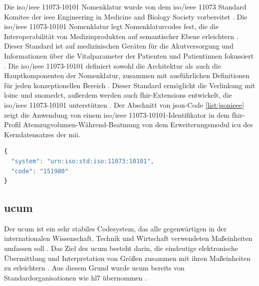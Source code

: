 Die \acs{iso}/\ac{ieee} 11073-10101\texttrademark{} Nomenklatur wurde von dem \acs{iso}/\ac{ieee} 11073\texttrademark{} Standard Komitee der \glqq \ac{ieee} Engineering in Medicine and Biology Society\grqq{} vorbereitet \cite{ieeeiso}. Die \acs{iso}/\ac{ieee} 11073-10101\texttrademark{} Nomenklatur legt Nomenklaturcodes fest, die die Interoperabilität von Medizinprodukten auf semantischer Ebene erleichtern \cite{ieeearch}. Dieser Standard ist auf medizinischen Geräten für die Akutversorgung und Informationen über die Vitalparameter der Patienten und Patientinnen fokussiert \cite{ieeeiso}. Die \acs{iso}/\ac{ieee} 11073-10101\texttrademark{} definiert sowohl die Architektur als auch die Hauptkomponenten der Nomenklatur, zusammen mit ausführlichen Definitionen für jeden konzeptionellen Bereich \cite{ieeesa}. Dieser Standard ermöglicht die Verlinkung mit \ac{loinc} und \ac{snomedct}, außerdem werden auch \ac{fhir}-Extensions entwickelt, die \acs{iso}/\ac{ieee} 11073-10101\texttrademark{} unterstützen \cite{ieeeextending}. Der Abschnitt von \ac{json}-Code \ref{list:jsonieee} zeigt die Anwendung von einem \acs{iso}/\ac{ieee} 11073-10101\texttrademark{}-Identifikator in dem \ac{fhir}-Profil Atemzugvolumen-Während-Beatmung von dem Erweiterungsmodul \glqq\ac{icu}\grqq{} des Kerndatensatzes der \ac{mii}.


\begin{lstlisting}[caption={[\acs{iso}/\acs{ieee} 11073-10101\texttrademark{} in \acs{fhir}] Beispiel der Anwendung von \acs{iso}/\acs{ieee} 11073-10101\texttrademark{} in \acs{fhir}.},language=JavaScript, label=list:jsonieee, captionpos=b]
{
  "system": "urn:iso:std:iso:11073:10101",
  "code": "151980"
}
\end{lstlisting}


\subsection{\acs{ucum}} \label{sub:ucum}

Der \ac{ucum} ist ein sehr stabiles Codesystem, das alle gegenwärtigen in der internationalen Wissenschaft, Technik und Wirtschaft verwendeten Maßeinheiten umfassen soll \cite{ucumwebnih}. Das Ziel des \ac{ucum} besteht darin, die eindeutige elektronische Übermittlung und Interpretation von Größen zusammen mit ihren Maßeinheiten zu erleichtern \cite{ucumwebnih, ucumweb}. Aus diesem Grund wurde \ac{ucum} bereits von Standardorganisationen wie \ac{hl7} übernommen \cite{ucumweb}.